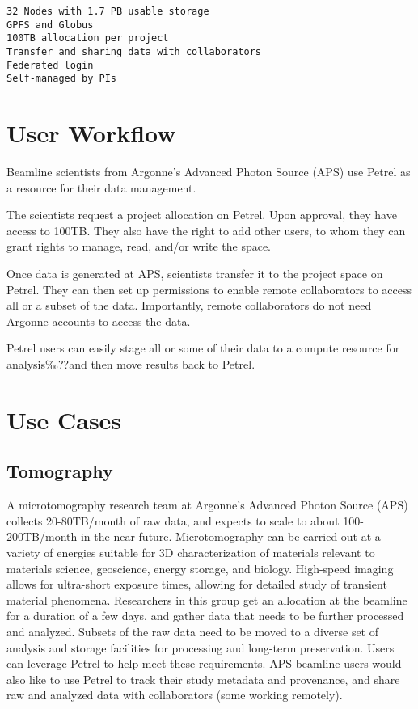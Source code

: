 \documentclass[sigconf]{acmart}
\begin{document}
\begin{verbatim}
32 Nodes with 1.7 PB usable storage
GPFS and Globus
100TB allocation per project
Transfer and sharing data with collaborators
Federated login
Self-managed by PIs
\end{verbatim}



\section{User Workflow}


Beamline scientists from Argonne's Advanced Photon Source (APS) use Petrel as a resource for their data management.

The scientists request a project allocation on Petrel. Upon approval, they have access to 100TB. They also have the right to add other users, to whom they can grant rights to manage, read, and/or write the space.

Once data is generated at APS, scientists transfer it to the project space on Petrel. They can then set up permissions to enable remote collaborators to access all or a subset of the data. Importantly, remote collaborators do not need Argonne accounts to access the data.

Petrel users can easily stage all or some of their data to a compute resource for analysis‰??and then move results back to Petrel.


\section{Use Cases}

\subsection{Tomography}

A microtomography research team at Argonne's Advanced Photon Source (APS) collects 20-80TB/month of raw data, and expects to scale to about 100-200TB/month in the near future. Microtomography can be carried out at a variety of energies suitable for 3D characterization of materials relevant to materials science, geoscience, energy storage, and biology. High-speed imaging allows for ultra-short exposure times, allowing for detailed study of transient material phenomena. Researchers in this group get an allocation at the beamline for a duration of a few days, and gather data that needs to be further processed and analyzed. Subsets of the raw data need to be moved to a diverse set of analysis and storage facilities for processing and long-term preservation. Users can leverage Petrel to help meet these requirements. APS beamline users would also like to use Petrel to track their study metadata and provenance, and share raw and analyzed data with collaborators (some working remotely).
\end{document}
